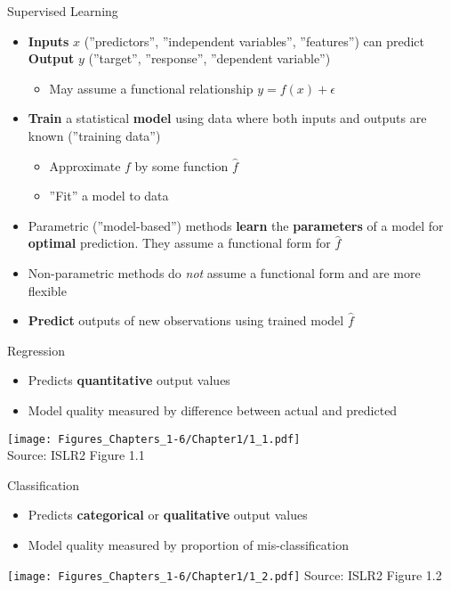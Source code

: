\documentclass[ignorenonframetext,xcolor=x11names]{beamer}
\begin{document}
\begin{frame}{Supervised Learning}
\begin{itemize}
  \item \textbf{Inputs} $x$ (''predictors'', ''independent variables'', ''features'') can predict \textbf{Output} $y$ (''target'', ''response'', ''dependent variable'')
  \begin{itemize}
  \item May assume a functional relationship $y = f(x) + \epsilon$
  \end{itemize}
  \item \textbf{Train} a statistical \textbf{model} using data where both inputs and outputs are known (''training data'')
  \begin{itemize}
  \item Approximate $f$ by some function $\hat{f}$
  \item ''Fit'' a model to data
  \end{itemize}
  \item Parametric (''model-based'') methods \textbf{learn} the \textbf{parameters} of a model for \textbf{optimal} prediction. They assume a functional form for $\hat{f}$
  \item Non-parametric methods do \emph{not} assume a functional form and are more flexible
  \item \textbf{Predict} outputs of new observations using trained model $\hat{f}$
\end{itemize}
\end{frame}


\begin{frame}{Regression}
  \begin{itemize}
    \item Predicts \textbf{quantitative} output values
    \item Model quality measured by difference between actual and predicted
  \end{itemize}
\centering
\vspace{5mm}
\texttt{[image: Figures\_Chapters\_1-6/Chapter1/1\_1.pdf]} \\
\scriptsize Source: ISLR2 Figure 1.1
\end{frame}

\begin{frame}{Classification}
  \begin{itemize}
     \item Predicts \textbf{categorical} or \textbf{qualitative} output values
     \item Model quality measured by proportion of mis-classification
  \end{itemize}
\centering
\vspace{5mm}
\texttt{[image: Figures\_Chapters\_1-6/Chapter1/1\_2.pdf]}
\scriptsize Source: ISLR2 Figure 1.2
\end{frame}
\end{document}
